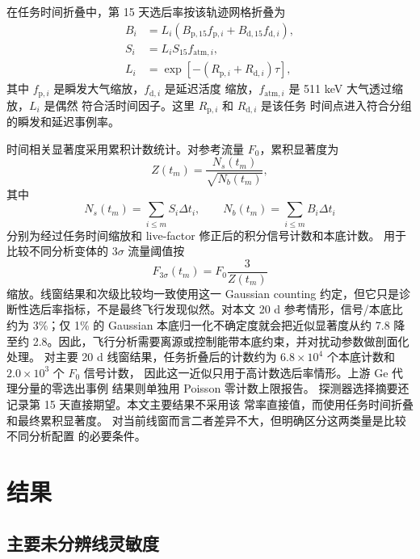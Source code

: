 \documentclass[preprint,12pt]{elsarticle}
\newcommand{\fzero}{F_{0}}
\newcommand{\fthree}{F_{3\sigma}}
\begin{document}
在任务时间折叠中，第 15 天选后率按该轨迹网格折叠为
\begin{align}
  B_i &= L_i\left(B_{\mathrm{p},15} f_{\mathrm{p},i}
        + B_{\mathrm{d},15} f_{\mathrm{d},i}\right),\\
  S_i &= L_i S_{15} f_{\mathrm{atm},i},\\
  L_i &= \exp[-(R_{\mathrm{p},i}+R_{\mathrm{d},i})\tau],
\end{align}
其中 $f_{\mathrm{p},i}$ 是瞬发大气缩放，$f_{\mathrm{d},i}$ 是延迟活度
缩放，$f_{\mathrm{atm},i}$ 是 511 keV 大气透过缩放，$L_i$ 是偶然
符合活时间因子。这里 $R_{\mathrm{p},i}$ 和 $R_{\mathrm{d},i}$ 是该任务
时间点进入符合分组的瞬发和延迟事例率。

时间相关显著度采用累积计数统计。对参考流量 $\fzero$，累积显著度为
\begin{equation}
  Z(t_m) = \frac{N_s(t_m)}{\sqrt{N_b(t_m)}},
\end{equation}
其中
\begin{equation}
  N_s(t_m)=\sum_{i\leq m}S_i\Delta t_i,\qquad
  N_b(t_m)=\sum_{i\leq m}B_i\Delta t_i
\end{equation}
分别为经过任务时间缩放和 live-factor 修正后的积分信号计数和本底计数。
用于比较不同分析变体的 $3\sigma$ 流量阈值按
\begin{equation}
  \fthree(t_m) = \fzero \frac{3}{Z(t_m)}
\end{equation}
缩放。线窗结果和次级比较均一致使用这一 Gaussian counting 约定，但它只是诊断性选后率指标，不是最终飞行发现似然。对本文 20 d 参考情形，信号/本底比约为 3\%；仅 1\% 的 Gaussian 本底归一化不确定度就会把近似显著度从约 7.8 降至约 2.8。因此，飞行分析需要离源或控制能带本底约束，并对扰动参数做剖面化处理。
对主要 20 d 线窗结果，任务折叠后的计数约为
$6.8\times10^4$ 个本底计数和 $2.0\times10^3$ 个 $\fzero$ 信号计数，
因此这一近似只用于高计数选后率情形。上游 Ge 代理分量的零选出事例
结果则单独用 Poisson 零计数上限报告。
探测器选择摘要还记录第 15 天直接期望。本文主要结果不采用该
常率直接值，而使用任务时间折叠和最终累积显著度。
对当前线窗而言二者差异不大，但明确区分这两类量是比较不同分析配置
的必要条件。

\section{结果}
\label{sec:results}

\subsection{主要未分辨线灵敏度}
\label{subsec:primary}
\end{document}
